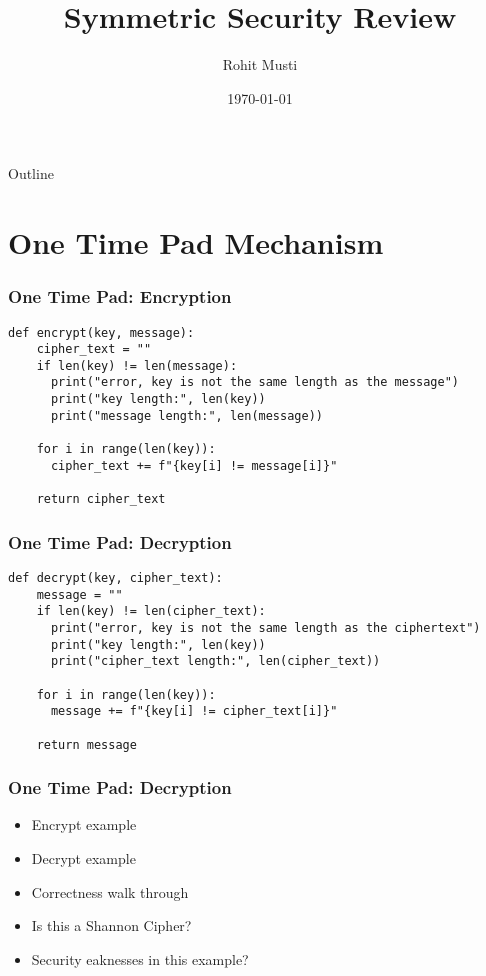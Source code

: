 \documentclass[handout]{beamer}
\title{Symmetric Security Review}
\author{Rohit Musti}
\institute{CUNY - Hunter College}
\date{\today}
\begin{document}
 
\frame{\titlepage}

\begin{frame}{Outline}
  \tableofcontents
\end{frame}

\section{One Time Pad Mechanism}

\begin{frame}[fragile]
  \frametitle{One Time Pad: Encryption}
  \begin{verbatim}
def encrypt(key, message):
    cipher_text = ""
    if len(key) != len(message):
      print("error, key is not the same length as the message")
      print("key length:", len(key))
      print("message length:", len(message))

    for i in range(len(key)):
      cipher_text += f"{key[i] != message[i]}"

    return cipher_text
  \end{verbatim}
\end{frame}

\begin{frame}[fragile]
  \frametitle{One Time Pad: Decryption}
  \begin{verbatim}
def decrypt(key, cipher_text):
    message = ""
    if len(key) != len(cipher_text):
      print("error, key is not the same length as the ciphertext")
      print("key length:", len(key))
      print("cipher_text length:", len(cipher_text))

    for i in range(len(key)):
      message += f"{key[i] != cipher_text[i]}"

    return message
  \end{verbatim}
\end{frame}

\begin{frame}
  \frametitle{One Time Pad: Decryption}
  \begin{itemize}
    \pause
    \item Encrypt example
    \pause
    \item Decrypt example
    \pause
    \item Correctness walk through
    \pause
    \item Is this a Shannon Cipher?
    \pause
    \item Security eaknesses in this example?
  \end{itemize}

\end{frame}
\end{document}
